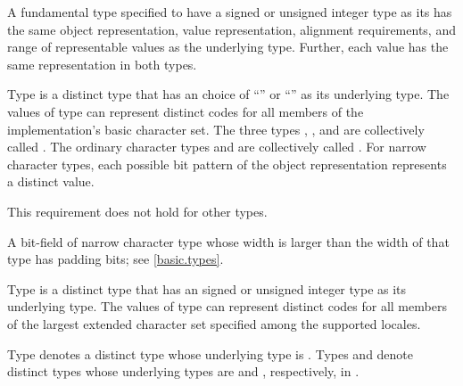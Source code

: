 \pnum
A fundamental type specified to have
a signed or unsigned integer type as its  has
the same object representation,
value representation,
alignment requirements, and
range of representable values as the underlying type.
Further, each value has the same representation in both types.

\pnum
{}%
%
%
%
%
%
Type  is a distinct type
that has an  choice of
``'' or ``'' as its underlying type.
The values of type  can represent distinct codes
for all members of the implementation's basic character set.
The three types , , and 
are collectively called
.
The ordinary character types and 
are collectively called .
For narrow character types,
each possible bit pattern of the object representation represents
a distinct value.
\begin{note}
This requirement does not hold for other types.
\end{note}
\begin{note}
A bit-field of narrow character type whose width is larger than
the width of that type has padding bits; see \ref{basic.types}.
\end{note}

\pnum
{}%
%
%
Type  is a distinct type that has
an 
signed or unsigned integer type as its underlying type.
The values of type  can represent
distinct codes for all members of the largest extended character set
specified among the supported locales.

\pnum
{}%
%
%
Type  denotes a distinct type
whose underlying type is .
%
%
%
%
%
%
Types  and  denote distinct types
whose underlying types are  and ,
respectively, in .

